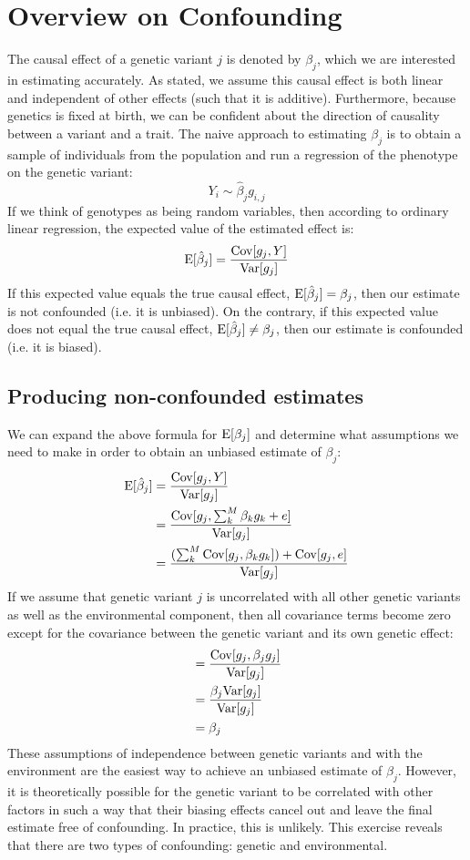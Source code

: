 \documentclass[12pt]{article}
\begin{document}
\section{Overview on Confounding}
The causal effect of a genetic variant $j$ is denoted by $\beta_j$, which we are interested in estimating accurately.
As stated, we assume this causal effect is both linear and independent of other effects (such that it is additive).
Furthermore, because genetics is fixed at birth, we can be confident about the direction of causality between a variant and a trait.
The naive approach to estimating $\beta_j$ is to obtain a sample of individuals from the population and run a regression of the phenotype on the genetic variant:
$$ Y_i \sim \hat{\beta}_j g_{i,j} $$
If we think of genotypes as being random variables, then according to ordinary linear regression, the expected value of the estimated effect is:
$$ \mathrm{E}[\hat{\beta}_j] = \frac{\mathrm{Cov}[g_j, Y]}{\mathrm{Var}[g_j]} $$
If this expected value equals the true causal effect, $ \mathrm{E}[\hat{\beta}_j] = \beta_j$, then our estimate is not confounded (i.e. it is unbiased).
On the contrary, if this expected value does not equal the true causal effect, $ \mathrm{E}[\hat{\beta}_j] \neq \beta_j$, then our estimate is confounded (i.e. it is biased).

\subsection{Producing non-confounded estimates}
We can expand the above formula for $\mathrm{E}[\beta_j]$ and determine what assumptions we need to make in order to obtain an unbiased estimate of $\beta_j$:
\begin{align*}
    \mathrm{E}[\hat{\beta}_j] &= \frac{\mathrm{Cov}[g_j, Y]}{\mathrm{Var}[g_j]} \\
    &= \frac{\mathrm{Cov}[g_j, \sum_k^M \beta_k g_{k} + e]}{\mathrm{Var}[g_j]} \\
    &= \frac{(\sum_k^M \mathrm{Cov}[g_j, \beta_k g_k]) + \mathrm{Cov}[g_j,e]}{\mathrm{Var}[g_j]}
\end{align*}
If we assume that genetic variant $j$ is uncorrelated with all other genetic variants as well as the environmental component, then all covariance terms become zero except for the covariance between the genetic variant and its own genetic effect:
\begin{align*}
    &= \frac{\mathrm{Cov}[g_j, \beta_j g_j]}{\mathrm{Var}[g_j]} \\
    &= \frac{\beta_j \mathrm{Var}[g_j]}{\mathrm{Var}[g_j]} \\
    &= \beta_j
\end{align*}
These assumptions of independence between genetic variants and with the environment are the easiest way to achieve an unbiased estimate of $\beta_j$.
However, it is theoretically possible for the genetic variant to be correlated with other factors in such a way that their biasing effects cancel out and leave the final estimate free of confounding.
In practice, this is unlikely.
This exercise reveals that there are two types of confounding: genetic and environmental.
\end{document}
